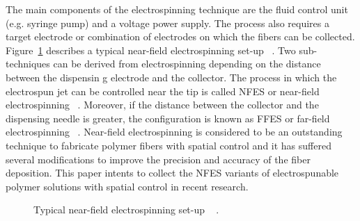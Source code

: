 \documentclass[3p,,preprint,12pt]{elsarticle}
\makeatletter
\def\fixFloatSize#1{}%
\makeatother
\begin{document}
The main components of the electrospinning technique are the fluid control unit (e.g. syringe pump) and a voltage power supply. The process also requires a target electrode or combination of electrodes on which the fibers can be collected.  Figure~\ref{f-fe28447572e9} describes a typical near-field electrospinning set-up \unskip~\cite{527120:12073538}. Two sub-techniques can be derived from electrospinning depending on the distance between the dispensin g electrode and the collector. The process in which the electrospun jet can be controlled near the tip is called NFES or near-field electrospinning \unskip~\cite{527120:12033655}. Moreover, if the distance between the collector and the dispensing needle is greater, the configuration is known as FFES or far-field electrospinning \unskip~\cite{527120:12073581}. Near-field electrospinning is considered to be an outstanding technique to fabricate polymer fibers with spatial control and it has suffered several modifications to improve the precision and accuracy of the fiber deposition. This paper intents to collect the NFES variants of electrospunable polymer solutions with spatial control in recent research.


\bgroup
\fixFloatSize{images/596d6818-a246-493e-bea0-03f815ab8ff8-unfes.jpg}
\begin{figure}[!htbp]
\centering \makeatletter{}
\makeatother 
\caption{{Typical near-field electrospinning set-up \unskip~\protect\cite{527120:11973130} .}}
\label{f-fe28447572e9}
\end{figure}
\egroup
\end{document}
